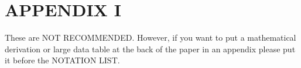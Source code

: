 \section{APPENDIX I}
These are NOT RECOMMENDED. However, if you want to put a mathematical derivation or large data table at the back of the paper in an appendix please put it before the NOTATION LIST. 